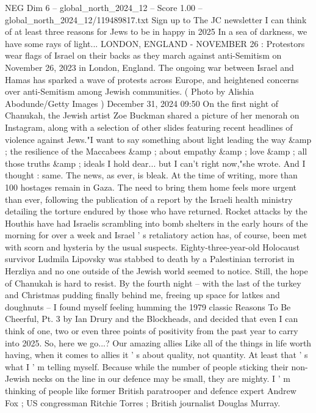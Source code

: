 \begin{textsample}{NEG Dim 6 – global\_north\_2024\_12 – Score 1.00 – global\_north\_2024\_12/119489817.txt}  \label{ex:f6_neg_183}
Sign up to The JC newsletter I can think of at least three reasons for Jews to be in happy in 2025 In a sea of darkness, we have some rays of light...
LONDON, ENGLAND - NOVEMBER 26 : Protestors wear flags of Israel on their backs as they march against anti-Semitism on November 26, 2023 in London, England.
The ongoing war between Israel and Hamas has sparked a wave of protests across Europe, and heightened concerns over anti-Semitism among Jewish communities. ( Photo by Alishia Abodunde/Getty Images ) December 31, 2024 09:50 On the first night of Chanukah, the Jewish artist Zoe Buckman shared a picture of her menorah on Instagram, along with a selection of other slides featuring recent headlines of violence against Jews."I want to say something about light leading the way \&amp ; the resilience of the Maccabees \&amp ; about empathy \&amp ; love \&amp ; all those truths \&amp ; ideals I hold dear... but I can't right now,"she wrote.
And I thought : same.
The news, as ever, is bleak.
At the time of writing, more than 100 hostages remain in Gaza.
The need to bring them home feels more urgent than ever, following the publication of a report by the Israeli health ministry detailing the torture endured by those who have returned.
Rocket attacks by the Houthis have had Israelis scrambling into bomb shelters in the early hours of the morning for over a week and Israel ' s retaliatory action has, of course, been met with scorn and hysteria by the usual suspects.
Eighty-three-year-old Holocaust survivor Ludmila Lipovsky was stabbed to death by a Palestinian terrorist in Herzliya and no one outside of the Jewish world seemed to notice.
Still, the hope of Chanukah is hard to resist.
By the fourth night -- with the last of the turkey and Christmas pudding finally behind me, freeing up space for latkes and doughnuts -- I found myself feeling humming the 1979 classic Reasons To Be Cheerful, Pt. 3 by Ian Drury and the Blockheads, and decided that even I can think of one, two or even three points of positivity from the past year to carry into 2025.
So, here we go...?
Our amazing allies Like all of the things in life worth having, when it comes to allies it ' s about quality, not quantity.
At least that ' s what I ' m telling myself.
Because while the number of people sticking their non-Jewish necks on the line in our defence may be small, they are mighty.
I ' m thinking of people like former British paratrooper and defence expert Andrew Fox ; US congressman Ritchie Torres ; British journalist Douglas Murray.

\end{textsample}
